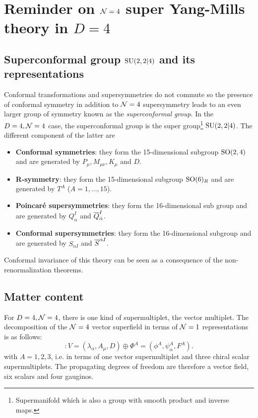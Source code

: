 \documentclass[a4paper,10pt]{article}
\begin{document}
\section{Reminder on $\mathcal{N}=4$ super Yang-Mills theory in $D=4$}\label{sec:N4SCFT}

    \subsection{Superconformal group $\text{SU}(2,2|4)$ and its representations}

        Conformal transformations and supersymmetries do not commute so the presence of conformal symmetry in addition to $\mathcal{N}=4$ supersymmetry leads to an even larger group of symmetry known as the \emph{superconformal group}. In the $D=4,\mathcal{N}=4$ case, the superconformal group is the super group\footnote{Supermanifold which is also a group with smooth product and inverse maps.} $\text{SU}(2,2|4)$. The different component of the latter are
        \begin{itemize}
            \item \textbf{Conformal symmetries}: they form the 15-dimensional subgroup $\text{SO}(2,4)$ and are generated by $P_\mu,M_{\mu\nu},K_\mu$ and $D$.
            \item \textbf{R-symmetry}: they form the 15-dimensional subgroup $\text{SO}(6)_R$ and are generated by $T^A$ ($A=1,\dots,15$).
            \item \textbf{Poincaré supersymmetries}: they form the 16-dimensional sub group \marker and are generated by $Q^I_\alpha$ and $\overline{Q}^I_{\dot{\alpha}}$.
            \item \textbf{Conformal supersymmetries}: they form the 16-dimensional subgroup \marker and are generated by $S_{\alpha I}$ and $\overline{S}^{\dot{\alpha} I}$.
        \end{itemize}

        Conformal invariance of this theory can be seen as a consequence of the non-renormalization theorems.

    \subsection{Matter content}
        
        For $D=4,\mathcal{N}=4$, there is one kind of supermultiplet, the vector multiplet. The decomposition of the $\mathcal{N} = 4$ vector superfield in terms of $\mathcal{N} = 1$ representations is as follows:
        \begin{equation}
            [\mN = 4 \text{ vector multiplet}] : V = (\lambda_\alpha, A_\mu, D) \oplus \Phi^A = (\phi^A,\psi^A_\alpha,F^A).
        \end{equation}
        with $A=1,2,3$, i.e. in terms of one vector supermultiplet and three chiral scalar supermultiplets. The propagating degrees of freedom are therefore a vector field, six scalars and four gauginos.
        
\end{document}
